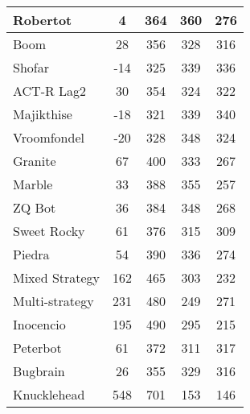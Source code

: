 \begin{table*}
\begin{tabular}{|l|c|c|c|c|}
Robertot & 4 & 364 & 360 & 276 \\ \hline 
Boom & 28 & 356 & 328 & 316 \\ \hline 
Shofar & -14 & 325 & 339 & 336 \\ \hline 
ACT-R Lag2 & 30 & 354 & 324 & 322 \\ \hline 
Majikthise & -18 & 321 & 339 & 340 \\ \hline 
Vroomfondel & -20 & 328 & 348 & 324 \\ \hline 
Granite & 67 & 400 & 333 & 267 \\ \hline 
Marble & 33 & 388 & 355 & 257 \\ \hline 
ZQ Bot & 36 & 384 & 348 & 268 \\ \hline 
Sweet Rocky & 61 & 376 & 315 & 309 \\ \hline 
Piedra & 54 & 390 & 336 & 274 \\ \hline 
Mixed Strategy & 162 & 465 & 303 & 232 \\ \hline 
Multi-strategy & 231 & 480 & 249 & 271 \\ \hline 
Inocencio & 195 & 490 & 295 & 215 \\ \hline 
Peterbot & 61 & 372 & 311 & 317 \\ \hline 
Bugbrain & 26 & 355 & 329 & 316 \\ \hline 
Knucklehead & 548 & 701 & 153 & 146 \\ \hline
        \end{tabular}
    \end{table*}